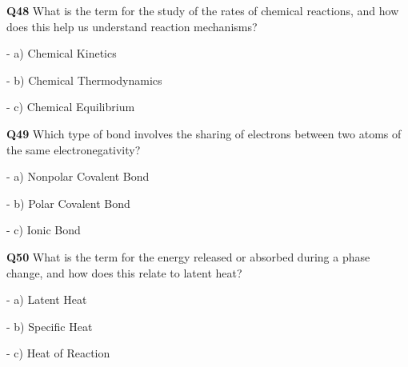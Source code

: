 \textbf{Q48} What is the term for the study of the rates of chemical reactions, and how does this help us understand reaction mechanisms?\par
\quad - a) Chemical Kinetics\par
\quad - b) Chemical Thermodynamics\par
\quad - c) Chemical Equilibrium\par

\textbf{Q49} Which type of bond involves the sharing of electrons between two atoms of the same electronegativity?\par
\quad - a) Nonpolar Covalent Bond\par
\quad - b) Polar Covalent Bond\par
\quad - c) Ionic Bond\par

\textbf{Q50} What is the term for the energy released or absorbed during a phase change, and how does this relate to latent heat?\par
\quad - a) Latent Heat\par
\quad - b) Specific Heat\par
\quad - c) Heat of Reaction\par